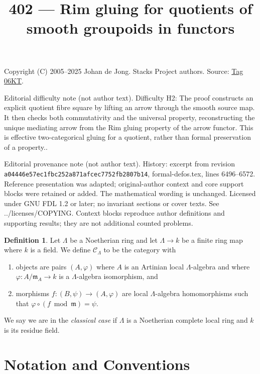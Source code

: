 \documentclass{amsart}
\theoremstyle{plain}
\theoremstyle{definition}
\newtheorem{definition}[subsection]{Definition}
\theoremstyle{remark}
\numberwithin{equation}{subsection}
\begin{document}
\title[Stacks Project, Tag 06KT]{402 --- Rim gluing for quotients of smooth groupoids in functors}
\maketitle
\noindent Copyright (C) 2005--2025 Johan de Jong. Stacks Project authors. Source: \href{https://stacks.math.columbia.edu/tag/06KT}{Tag 06KT}.

\noindent Editorial difficulty note (not author text). Difficulty H2: The proof constructs an explicit quotient fibre square by lifting an arrow through the smooth source map. It then checks both commutativity and the universal property, reconstructing the unique mediating arrow from the Rim gluing property of the arrow functor. This is effective two-categorical gluing for a quotient, rather than formal preservation of a property..

\noindent Editorial provenance note (not author text). History: excerpt from revision \texttt{a0444\allowbreak 6e57e\allowbreak c1fbc\allowbreak 252a8\allowbreak 71afc\allowbreak ec775\allowbreak 2fb28\allowbreak 07b14}, formal-defos.tex, lines 6496--6572. Reference presentation was adapted; original-author context and core support blocks were retained or added. The mathematical wording is unchanged. Licensed under GNU FDL 1.2 or later; no invariant sections or cover texts. See ../licenses/COPYING. Context blocks reproduce author definitions and supporting results; they are not additional counted problems.

\begin{definition}
\label{definition-CLambda}
Let $\Lambda$ be a Noetherian ring and let $\Lambda \to k$ be a finite
ring map where $k$ is a field. We define {\it $\mathcal{C}_\Lambda$} to be
the category with
\begin{enumerate}
\item objects are pairs $(A, \varphi)$ where $A$ is an Artinian local
$\Lambda$-algebra and where $\varphi : A/\mathfrak m_A \to k$ is a
$\Lambda$-algebra isomorphism, and
\item morphisms $f : (B, \psi) \to (A, \varphi)$ are local $\Lambda$-algebra
homomorphisms such that $\varphi \circ (f \bmod \mathfrak m) = \psi$.
\end{enumerate}
We say we are in the {\it classical case} if $\Lambda$ is a Noetherian
complete local ring and $k$ is its residue field.
\end{definition}

\section{Notation and Conventions}
\label{section-notations-conventions}
\end{document}
